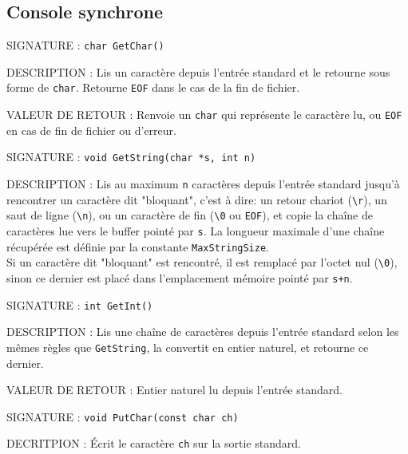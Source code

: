 \documentclass{article}
\begin{document}
	\subsection{Console synchrone}
		\begin{description}
			\item{SIGNATURE : } \texttt{char GetChar()}
			\item{DESCRIPTION :}{ Lis un caractère depuis l'entrée standard et le retourne sous forme de \texttt{char}. Retourne \texttt{EOF} dans le cas de la fin de fichier.}
			\item{VALEUR DE RETOUR : } Renvoie un \texttt{char} qui représente le caractère lu, ou \texttt{EOF} en cas de fin de fichier ou d'erreur.
		\end{description}
		\vspace{2.5mm}
		\begin{description}
			\item{SIGNATURE : } \texttt{void GetString(char *s, int n)}
			\item{DESCRIPTION : } Lis au maximum \texttt{n} caractères depuis l'entrée standard jusqu'à rencontrer un caractère dit "bloquant", c'est à dire: un retour chariot (\texttt{\textbackslash{}r}), un saut de ligne (\texttt{\textbackslash{}n}), ou un caractère de fin (\texttt{\textbackslash{}0} ou \texttt{EOF}), et copie la chaîne de caractères lue vers le buffer pointé par \texttt{s}. La longueur maximale d'une chaîne récupérée est définie par la constante \texttt{MaxStringSize}. \\Si un caractère dit "bloquant" est rencontré, il est remplacé par l'octet nul (\texttt{\textbackslash{}0}), sinon ce dernier est placé dans l'emplacement mémoire pointé par \texttt{s+n}.
		\end{description}
		\vspace{2.5mm}
		\begin{description}
			\item{SIGNATURE : } \texttt{int GetInt()}
			\item{DESCRIPTION : } Lis une chaîne de caractères depuis l'entrée standard selon les mêmes règles que \texttt{GetString}, la convertit en entier naturel, et retourne ce dernier.
			\item{VALEUR DE RETOUR : } Entier naturel lu depuis l'entrée standard.
		\end{description}
		\vspace{2.5mm}
		\begin{description}
			\item{SIGNATURE : } \texttt{void PutChar(const char ch)}
			\item{DECRITPION : } Écrit le caractère \texttt{ch} sur la sortie standard. 
		\end{description}
\end{document}
